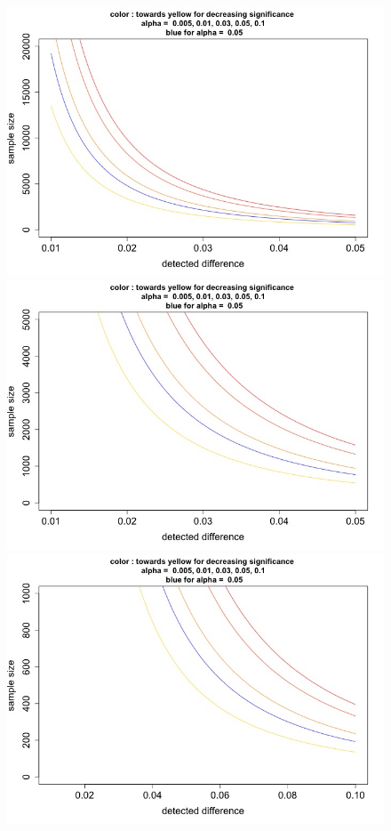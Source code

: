 \documentclass[14pt]{article}
\begin{document}
\begin{figure}[h!]
\centering
\begin{minipage}{0.31\textwidth}
  \centering
\includegraphics[scale=0.23]{plots/plot_samplesize VS effectsize_alfa 1.jpg}  
\end{minipage}
\begin{minipage}{0.31\textwidth}
  \centering
\includegraphics[scale=0.23]{plots/plot_samplesize VS effectsize_alfa 2.jpg}  
\end{minipage}
\begin{minipage}{0.31\textwidth}
  \centering
\includegraphics[scale=0.23]{plots/plot_samplesize VS effectsize_alfa 3.jpg}  

\end{minipage}
\end{figure}
\end{document}
